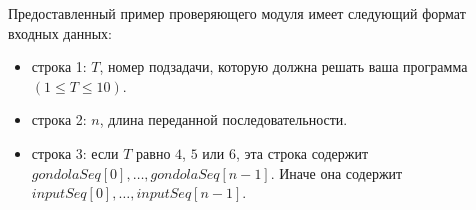 Предоставленный пример проверяющего модуля имеет следующий формат входных данных:
\begin{itemize}
\item строка 1: $T$, номер подзадачи, которую должна решать ваша программа $(1 \le T \le 10)$.
\item строка 2: $n$, длина переданной последовательности.
\item строка 3: если $T$ равно $4$, $5$ или $6$, эта строка содержит $gondolaSeq[0], \ldots, gondolaSeq[n - 1]$. Иначе она содержит $inputSeq[0], \ldots, inputSeq[n - 1]$.
\end{itemize}
